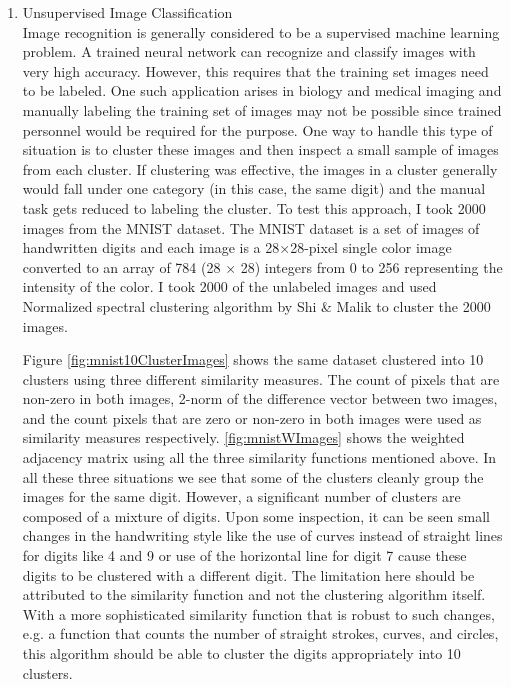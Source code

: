 \documentclass[10pt,a4paper, nocenter]{report}
\begin{document}
\begin{enumerate}
        \item{Unsupervised Image Classification}\\
        Image recognition is generally considered to be a supervised machine learning problem. A trained neural network can recognize and classify images with very high accuracy. However, this requires that the training set images need to be labeled. One such application arises in biology and medical imaging and manually labeling the training set of images may not be possible since trained personnel would be required for the purpose. One way to handle this type of situation is to cluster these images and then inspect a small sample of images from each cluster. If clustering was effective, the images in a cluster generally would fall under one category (in this case, the same digit) and the manual task gets reduced to labeling the cluster. To test this approach, I took 2000 images from the MNIST dataset. The MNIST dataset is a set of images of handwritten digits and each image is a 28$\times$28-pixel single color image converted to an array of 784 (28 $\times$ 28) integers from 0 to 256 representing the intensity of the color. I took 2000 of the unlabeled images and used Normalized spectral clustering algorithm by Shi \& Malik \cite{Shi-Malik-maxcut-00} to cluster the 2000 images.
        
        Figure \ref{fig:mnist10ClusterImages} shows the same dataset clustered into 10 clusters using three different similarity measures. The count of pixels that are non-zero in both images, 2-norm of the difference vector between two images, and the count pixels that are zero or non-zero in both images were used as similarity measures respectively. \ref{fig:mnistWImages} shows the weighted adjacency matrix using all the three similarity functions mentioned above. In all these three situations we see that some of the clusters cleanly group the images for the same digit. However, a significant number of clusters are composed of a mixture of digits. Upon some inspection, it can be seen small changes in the handwriting style like the use of curves instead of straight lines for digits like 4 and 9 or use of the horizontal line for digit 7 cause these digits to be clustered with a different digit. The limitation here should be attributed to the similarity function and not the clustering algorithm itself. With a more sophisticated similarity function that is robust to such changes, e.g. a function that counts the number of straight strokes, curves, and circles, this algorithm should be able to cluster the digits appropriately into 10 clusters.


\end{enumerate}
\end{document}
